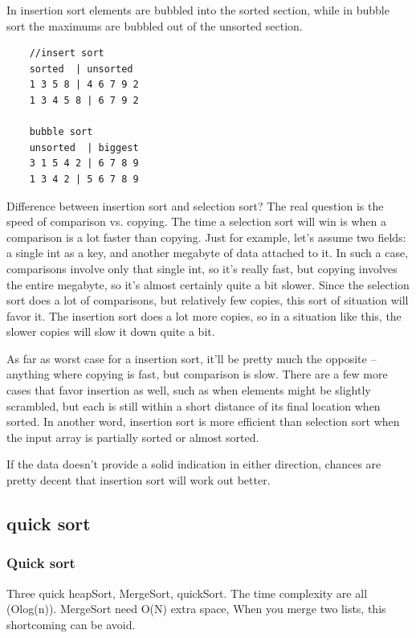 \documentclass[a4paper,11pt,twoside]{book}
\begin{document}
	\par In insertion sort elements are bubbled into the sorted section, while in bubble sort the maximums are bubbled out of the unsorted section.

\begin{lstlisting}
	//insert sort
	sorted  | unsorted
	1 3 5 8 | 4 6 7 9 2
	1 3 4 5 8 | 6 7 9 2
	
	bubble sort
	unsorted  | biggest
	3 1 5 4 2 | 6 7 8 9
	1 3 4 2 | 5 6 7 8 9
\end{lstlisting}

\par Difference between insertion sort and selection sort? The real question is the speed of comparison vs. copying. The time a selection sort will win is when a comparison is a lot faster than copying. Just for example, let's assume two fields: a single int as a key, and another megabyte of data attached to it. In such a case, comparisons involve only that single int, so it's really fast, but copying involves the entire megabyte, so it's almost certainly quite a bit slower. Since the selection sort does a lot of comparisons, but relatively few copies, this sort of situation will favor it. The insertion sort does a lot more copies, so in a situation like this, the slower copies will slow it down quite a bit.

\par As far as worst case for a insertion sort, it'll be pretty much the opposite -- anything where copying is fast, but comparison is slow. There are a few more cases that favor insertion as well, such as when elements might be slightly scrambled, but each is still within a short distance of its final location when sorted. In another word, insertion sort is more efficient than selection sort when the input array is partially sorted or almost sorted.

\par If the data doesn't provide a solid indication in either direction, chances are pretty decent that insertion sort will work out better.

\subsection{quick sort}

\subsubsection{Quick sort}

	\par Three quick heapSort, MergeSort, quickSort. The time complexity are all (Olog(n)). MergeSort need O(N) extra space, When you merge two lists, this shortcoming can be avoid.
\end{document}
